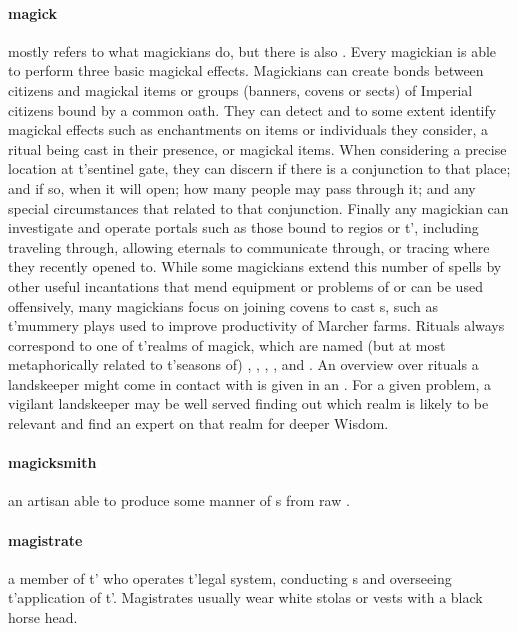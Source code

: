 \paragraph{magick} mostly refers to what magickians do, but there is also . Every magickian is able to perform three basic magickal effects. Magickians can create bonds between citizens and magickal items or groups (banners, covens or sects) of Imperial citizens bound by a common oath. They can detect and to some extent identify magickal effects such as enchantments on items or individuals they consider, a ritual being cast in their presence, or magickal items. When considering a precise location at t'\allowbreak sentinel gate, they can discern if there is a conjunction to that place; and if so, when it will open; how many people may pass through it; and any special circumstances that related to that conjunction. Finally any magickian can investigate and operate portals such as those bound to regios or t'\allowbreak {}, including traveling through, allowing eternals to communicate through, or tracing where they recently opened to. While some magickians extend this number of spells by other useful incantations that mend equipment or problems of  or can be used offensively, many magickians focus on joining covens to cast s, such as t'\allowbreak mummery plays used to improve productivity of Marcher farms. Rituals always correspond to one of t'\allowbreak realms of magick, which are named (but at most metaphorically related to t'\allowbreak seasons of) , , , ,  and . An overview over rituals a landskeeper might come in contact with is given in an . For a given problem, a vigilant landskeeper may be well served finding out which realm is likely to be relevant and find an expert on that realm for deeper Wisdom. 
\paragraph{magicksmith} an artisan able to produce some manner of s from raw .
\paragraph{magistrate} a member of t'\allowbreak {} who operates t'\allowbreak legal system, conducting s and overseeing t'\allowbreak application of t'\allowbreak {}. Magistrates usually wear white stolas or vests with a black horse head.
